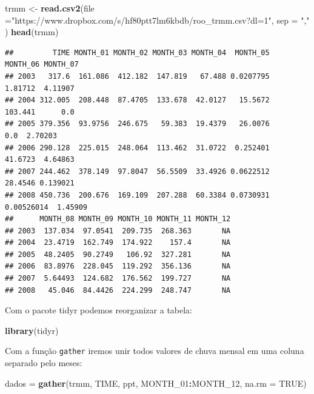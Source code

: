 \documentclass[
]{book}
\newenvironment{Shaded}{\begin{snugshade}}{\end{snugshade}}
\newcommand{\DataTypeTok}[1]{\textcolor[rgb]{0.13,0.29,0.53}{#1}}
\newcommand{\DecValTok}[1]{\textcolor[rgb]{0.00,0.00,0.81}{#1}}
\newcommand{\KeywordTok}[1]{\textcolor[rgb]{0.13,0.29,0.53}{\textbf{#1}}}
\newcommand{\NormalTok}[1]{#1}
\newcommand{\OperatorTok}[1]{\textcolor[rgb]{0.81,0.36,0.00}{\textbf{#1}}}
\newcommand{\OtherTok}[1]{\textcolor[rgb]{0.56,0.35,0.01}{#1}}
\newcommand{\StringTok}[1]{\textcolor[rgb]{0.31,0.60,0.02}{#1}}
\begin{document}
\begin{Shaded}
\begin{Highlighting}[]
\NormalTok{trmm <-}\StringTok{ }\KeywordTok{read.csv2}\NormalTok{(}\DataTypeTok{file =}\StringTok{"https://www.dropbox.com/s/hf80ptt7lm6kbdb/roo_trmm.csv?dl=1"}\NormalTok{, }\DataTypeTok{sep =} \StringTok{","}\NormalTok{ )}
\KeywordTok{head}\NormalTok{(trmm)}
\end{Highlighting}
\end{Shaded}

\begin{verbatim}
##         TIME MONTH_01 MONTH_02 MONTH_03 MONTH_04  MONTH_05   MONTH_06 MONTH_07
## 2003   317.6  161.086  412.182  147.819   67.488 0.0207795    1.81712  4.11907
## 2004 312.005  208.448  87.4705  133.678  42.0127   15.5672    103.441      0.0
## 2005 379.356  93.9756  246.675   59.383  19.4379   26.0076        0.0  2.70203
## 2006 290.128  225.015  248.064  113.462  31.0722  0.252401    41.6723  4.64863
## 2007 244.462  378.149  97.8047  56.5509  33.4926 0.0622512    28.4546 0.139021
## 2008 450.736  200.676  169.109  207.288  60.3384 0.0730931 0.00526014  1.45909
##      MONTH_08 MONTH_09 MONTH_10 MONTH_11 MONTH_12
## 2003  137.034  97.0541  209.735  268.363       NA
## 2004  23.4719  162.749  174.922    157.4       NA
## 2005  48.2405  90.2749   106.92  327.281       NA
## 2006  83.8976  228.045  119.292  356.136       NA
## 2007  5.64493  124.682  176.562  199.727       NA
## 2008   45.046  84.4426  224.299  248.747       NA
\end{verbatim}

Com o pacote tidyr podemos reorganizar a tabela:

\begin{Shaded}
\begin{Highlighting}[]
\KeywordTok{library}\NormalTok{(tidyr)}
\end{Highlighting}
\end{Shaded}

Com a função \texttt{gather} iremos unir todos valores de chuva mensal em uma coluna separado pelo meses:

\begin{Shaded}
\begin{Highlighting}[]
\NormalTok{dados =}\StringTok{ }\KeywordTok{gather}\NormalTok{(trmm, TIME, ppt, MONTH_}\DecValTok{01}\OperatorTok{:}\NormalTok{MONTH_}\DecValTok{12}\NormalTok{, }\DataTypeTok{na.rm =} \OtherTok{TRUE}\NormalTok{)}
\end{Highlighting}
\end{Shaded}
\end{document}
